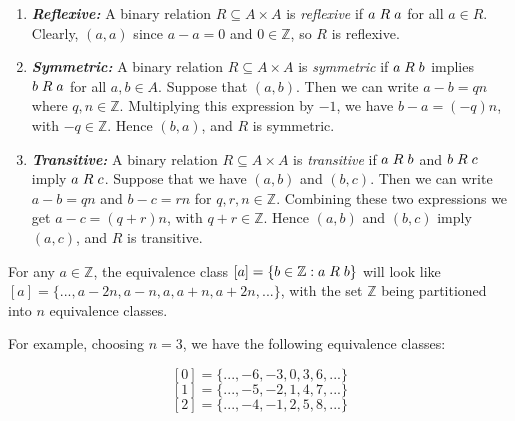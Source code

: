 \documentclass[a4paper,12pt]{article}
\begin{document}
\begin{enumerate}
\item \textit{\textbf{Reflexive:}} A binary relation $R \subseteq A \times A$ is \textit{reflexive} if $a \hspace{1mm} R \hspace{1mm} a$ for all $a \in R$. Clearly, $(a,a)$ since $a - a = 0$ and $0 \in \mathbb{Z}$, so $R$ is reflexive. 

\item \textit{\textbf{Symmetric:}} A binary relation $R \subseteq A \times A$ is \textit{symmetric} if $a \hspace{1mm} R \hspace{1mm} b$ implies $b \hspace{1mm} R \hspace{1mm} a$ for all $a, b \in A$. Suppose that $(a,b)$. Then we can write $a - b = qn$ where $q, n \in \mathbb{Z}$. Multiplying this expression by $-1$, we have $b - a = (-q)n$, with $-q \in \mathbb{Z}$. Hence $(b,a)$, and $R$ is symmetric. 

\item \textit{\textbf{Transitive:}} A binary relation $R \subseteq A \times A$ is \textit{transitive} if $a \hspace{1mm} R \hspace{1mm} b$ and $b \hspace{1mm} R \hspace{1mm} c$ imply $a \hspace{1mm} R \hspace{1mm} c$. Suppose that we have $(a,b)$ and $(b,c)$. Then we can write $a - b = qn$ and $b - c = rn$ for $q, r, n \in \mathbb{Z}$. Combining these two expressions we get $a - c = (q+r)n$, with $q+r \in \mathbb{Z}$. Hence $(a,b)$ and $(b,c)$ imply $(a,c)$, and $R$ is transitive. 
\end{enumerate}

For any $a \in \mathbb{Z}$, the equivalence class $[a] = \{b \in \mathbb{Z} : a \hspace{1mm} R \hspace{1mm} b\}$ will look like $[a] = \{ ..., a - 2n, a - n, a,  a + n, a + 2n, ...\}$, with the set $\mathbb{Z}$ being partitioned into $n$ equivalence classes. 

For example, choosing $n=3$, we have the following equivalence classes:

\[ [0] = \{ ..., -6, -3, 0, 3, 6, ...\} \]
\[ [1] = \{ ..., -5, -2, 1, 4, 7, ...\} \] 
\[ [2] = \{ ..., -4, -1, 2, 5, 8, ...\} \]
\end{document}
